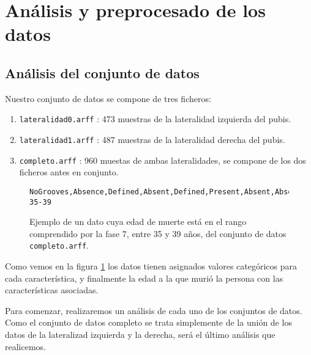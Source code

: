 \section{Análisis y preprocesado de los datos}

\subsection{Análisis del conjunto de datos}

Nuestro conjunto de datos se compone de tres ficheros:

\begin{enumerate}
	\item \texttt{lateralidad0.arff} : 473 muestras de la lateralidad izquierda del pubis.
	\item \texttt{lateralidad1.arff} : 487 muestras de la lateralidad derecha del pubis.
	\item \texttt{completo.arff} : 960 muestas de ambas lateralidades, se compone de los dos ficheros antes en conjunto.
\end{enumerate}

\begin{figure}[H]
	\begin{lstlisting}[language={}]
	NoGrooves,Absence,Defined,Absent,Defined,Present,Absent,Absent,FormedWithoutRarefactions,Ph07-35-39
	\end{lstlisting}
	\caption{Ejemplo de un dato cuya edad de muerte está en el rango comprendido por la fase 7, entre 35 y 39 años, del conjunto de datos \texttt{completo.arff}.}
	\label{fig:ejemplo_dato}
\end{figure}

Como vemos en la figura \ref{fig:ejemplo_dato} los datos tienen asignados valores categóricos para cada característica, y finalmente la edad a la que murió la persona con las características asociadas.

Para comenzar, realizaremos un análisis de cada uno de los conjuntos de datos. Como el conjunto de datos completo se trata simplemente de la unión de los datos de la lateralizad izquierda y la derecha, será el último análisis que realicemos.

